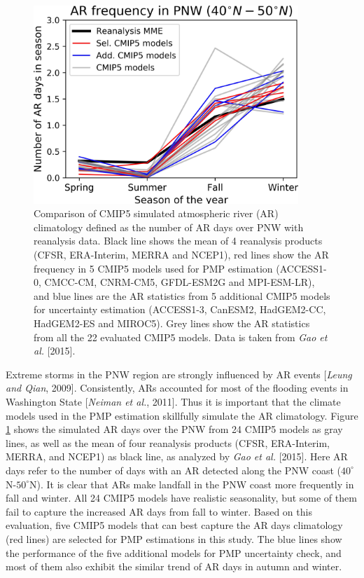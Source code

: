 \begin{figure}[htbp]
	\centering
	\includegraphics[width=10cm]{pics/ch5/fig4.jpg}
	\caption{Comparison of CMIP5 simulated atmospheric river (AR) climatology defined as the number of AR days over PNW with reanalysis data. Black line shows the mean of 4 reanalysis products (CFSR, ERA-Interim, MERRA and NCEP1), red lines show the AR frequency in 5 CMIP5 models used for PMP estimation (ACCESS1-0, CMCC-CM, CNRM-CM5, GFDL-ESM2G and MPI-ESM-LR), and blue lines are the AR statistics from 5 additional CMIP5 models for uncertainty estimation (ACCESS1-3, CanESM2, HadGEM2-CC, HadGEM2-ES and MIROC5). Grey lines show the AR statistics from all the 22 evaluated CMIP5 models. Data is taken from \textit{Gao et al.} [2015].}
	\label{fig:5-4}
\end{figure}

Extreme storms in the PNW region are strongly influenced by AR events [\textit{Leung and Qian}, 2009]. Consistently, ARs accounted for most of the flooding events in Washington State [\textit{Neiman et al.}, 2011]. Thus it is important that the climate models used in the PMP estimation skillfully simulate the AR climatology. Figure \ref{fig:5-4} shows the simulated AR days over the PNW from 24 CMIP5 models as gray lines, as well as the mean of four reanalysis products (CFSR, ERA-Interim, MERRA, and NCEP1) as black line, as analyzed by \textit{Gao et al.} [2015]. Here AR days refer to the number of days with an AR detected along the PNW coast ($40^{\circ}$N-$50^{\circ}$N). It is clear that ARs make landfall in the PNW coast more frequently in fall and winter. All 24 CMIP5 models have realistic seasonality, but some of them fail to capture the increased AR days from fall to winter. Based on this evaluation, five CMIP5 models that can best capture the AR days climatology (red lines) are selected for PMP estimations in this study. The blue lines show the performance of the five additional models for PMP uncertainty check, and most of them also exhibit the similar trend of AR days in autumn and winter.

